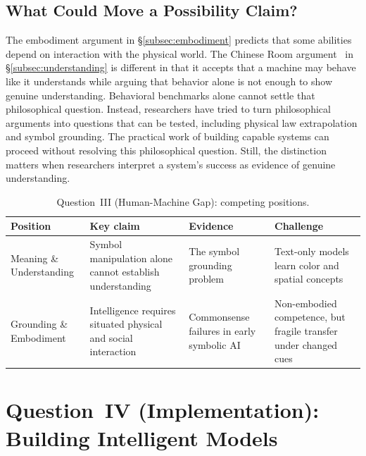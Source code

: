\documentclass[acmsmall,screen,review,anonymous]{acmart}
\begin{document}
\subsection{What Could Move a Possibility Claim?}
The embodiment argument in \S\ref{subsec:embodiment} predicts that some abilities depend on interaction with the physical world.
%
The Chinese Room argument~\citep{searle1980} in \S\ref{subsec:understanding} is different in that it accepts that a machine may behave like it understands while arguing that behavior alone is not enough to show genuine understanding.
%
Behavioral benchmarks alone cannot settle that philosophical question. 
%
Instead, researchers have tried to turn philosophical arguments into questions that can be tested, including physical law extrapolation and symbol grounding. 
%
The practical work of building capable systems can proceed without resolving this philosophical question.
%
Still, the distinction matters when researchers interpret a system's success as evidence of genuine understanding.

\begin{table}[t]
\caption{Question~III (Human-Machine Gap): competing positions.}
\label{tab:possibility-framework}
\centering
\footnotesize
\setlength{\tabcolsep}{3pt}
\renewcommand{\arraystretch}{1.13}
\begin{tabularx}{\textwidth}{p{} Y Y Y}
\toprule
Position & Key claim & Evidence & Challenge \\
\midrule
Meaning \& Understanding &
Symbol manipulation alone cannot establish understanding~\citep{searle1980} &
The symbol grounding problem~\citep{HARNAD1990335} &
Text-only models learn color and spatial concepts~\citep{abdou-etal-2021-language, patel2022mapping, piantadosi2022meaning} \\
\addlinespace
Grounding \& Embodiment &
Intelligence requires situated physical and social interaction~\citep{dreyfus1972} &
Commonsense failures in early symbolic AI~\citep{dreyfus1972} &
Non-embodied competence, but fragile transfer under changed cues~\citep{kang2025how, motamed2026physics} \\
\bottomrule
\end{tabularx}
\end{table}




\section{Question~IV (Implementation): Building Intelligent Models}
\label{sec:impl}
\end{document}
